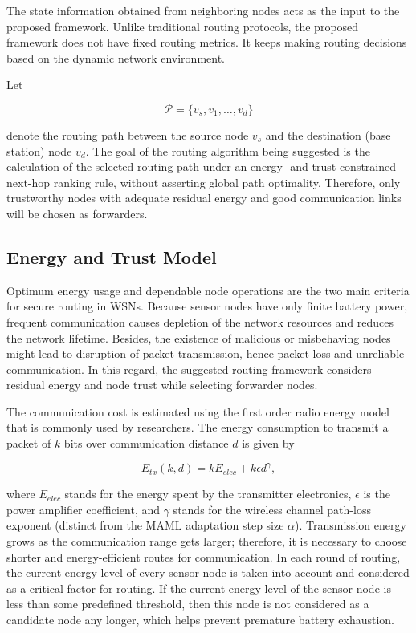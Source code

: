 \documentclass[pdflatex,sn-mathphys-num]{sn-jnl}
\begin{document}
The state information obtained from neighboring nodes acts as the input to the proposed framework. Unlike traditional routing protocols, the proposed framework does not have fixed routing metrics. It keeps making routing decisions based on the dynamic network environment.

Let

\[
\mathcal{P}=\{v_s,v_1,\ldots,v_d\}
\]

denote the routing path between the source node $v_s$ and the destination (base station) node $v_d$. The goal of the routing algorithm being suggested is the calculation of the selected routing path under an energy- and trust-constrained next-hop ranking rule, without asserting global path optimality. Therefore, only trustworthy nodes with adequate residual energy and good communication links will be chosen as forwarders.

\subsection{Energy and Trust Model}

Optimum energy usage and dependable node operations are the two main criteria for secure routing in WSNs. Because sensor nodes have only finite battery power, frequent communication causes depletion of the network resources and reduces the network lifetime. Besides, the existence of malicious or misbehaving nodes might lead to disruption of packet transmission, hence packet loss and unreliable communication. In this regard, the suggested routing framework considers residual energy and node trust while selecting forwarder nodes.

The communication cost is estimated using the first order radio energy model \cite{heinzelman2000energy} that is commonly used by researchers. The energy consumption to transmit a packet of $k$ bits over communication distance $d$ is given by

\begin{equation}
E_{tx}(k,d)=kE_{elec}+k\epsilon d^{\gamma},
\end{equation}

where $E_{elec}$ stands for the energy spent by the transmitter electronics, $\epsilon$ is the power amplifier coefficient, and $\gamma$ stands for the wireless channel path-loss exponent (distinct from the MAML adaptation step size $\alpha$). Transmission energy grows as the communication range gets larger; therefore, it is necessary to choose shorter and energy-efficient routes for communication. In each round of routing, the current energy level of every sensor node is taken into account and considered as a critical factor for routing. If the current energy level of the sensor node is less than some predefined threshold, then this node is not considered as a candidate node any longer, which helps prevent premature battery exhaustion.
\end{document}
